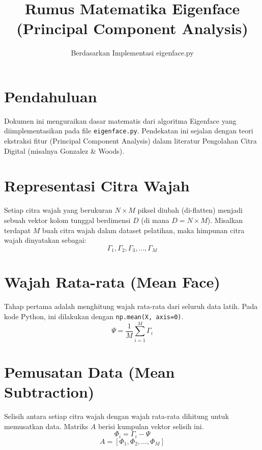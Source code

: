 \documentclass[a4paper,12pt]{article}
\title{Rumus Matematika Eigenface (Principal Component Analysis)}
\author{Berdasarkan Implementasi eigenface.py}
\date{}
\begin{document}
\maketitle

\section*{Pendahuluan}
Dokumen ini menguraikan dasar matematis dari algoritma Eigenface yang diimplementasikan pada file \texttt{eigenface.py}. Pendekatan ini sejalan dengan teori ekstraksi fitur (Principal Component Analysis) dalam literatur Pengolahan Citra Digital (misalnya Gonzalez \& Woods).

\section{Representasi Citra Wajah}
Setiap citra wajah yang berukuran $N \times M$ piksel diubah (di-flatten) menjadi sebuah vektor kolom tunggal berdimensi $D$ (di mana $D = N \times M$).
Misalkan terdapat $M$ buah citra wajah dalam dataset pelatihan, maka himpunan citra wajah dinyatakan sebagai:
\begin{equation}
    \Gamma_1, \Gamma_2, \Gamma_3, \dots, \Gamma_M
\end{equation}

\section{Wajah Rata-rata (Mean Face)}
Tahap pertama adalah menghitung wajah rata-rata dari seluruh data latih. Pada kode Python, ini dilakukan dengan \texttt{np.mean(X, axis=0)}.
\begin{equation}
    \Psi = \frac{1}{M} \sum_{i=1}^{M} \Gamma_i
\end{equation}

\section{Pemusatan Data (Mean Subtraction)}
Selisih antara setiap citra wajah dengan wajah rata-rata dihitung untuk memusatkan data. Matriks $A$ berisi kumpulan vektor selisih ini.
\begin{equation}
    \Phi_i = \Gamma_i - \Psi
\end{equation}
\begin{equation}
    A = [\Phi_1, \Phi_2, \dots, \Phi_M]
\end{equation}
\end{document}

